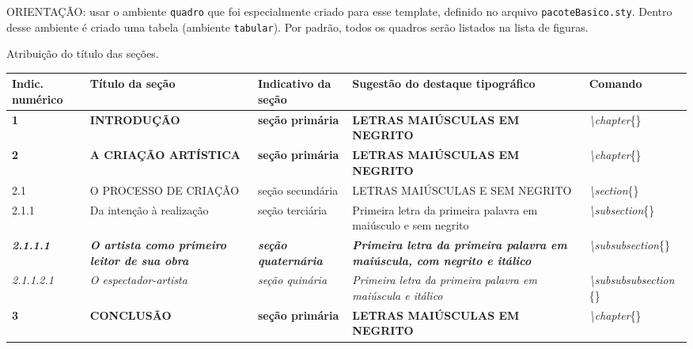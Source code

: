 

ORIENTAÇÃO: usar o  ambiente \verb|quadro| que foi especialmente criado para esse template, definido no arquivo \verb|pacoteBasico.sty|. Dentro desse ambiente é criado uma tabela (ambiente \verb|tabular|). Por padrão, todos os quadros serão listados na lista de figuras.
\begin{quadro}[H]
	\centering
	\caption{Atribuição do título das seções.}
	\begin{tabularx}{\columnwidth}{|X|X|X|X|X|}
		\hline
		Indic. numérico & Título da seção & Indicativo da seção & Sugestão do destaque tipográfico & Comando \\ \hline
		
		\textbf{1} & \textbf{INTRODUÇÃO} & \textbf{seção primária} & \textbf{LETRAS MAIÚSCULAS EM NEGRITO} & \textit{\textbackslash chapter}\{\} \\ \hline
		
		\textbf{2} & \textbf{A CRIAÇÃO ARTÍSTICA} & \textbf{seção primária} & \textbf{LETRAS MAIÚSCULAS EM NEGRITO} & \textit{\textbackslash chapter}\{\} \\ \hline
		
		2.1 & O PROCESSO DE CRIAÇÃO & seção secundária & LETRAS MAIÚSCULAS E SEM NEGRITO  & \textit{\textbackslash section}\{\} \\ \hline %
		
		2.1.1 & Da intenção à realização & seção terciária & Primeira letra da   primeira palavra em maiúsculo e sem negrito & \textit{\textbackslash subsection}\{\} \\ \hline
		
		\textit{\textbf{2.1.1.1}} & \textit{\textbf{O artista como primeiro leitor de sua obra}} & \textit{\textbf{seção quaternária}} & \textit{\textbf{Primeira letra da primeira palavra em maiúscula, com negrito e itálico}} & \textit{\textbackslash subsubsection}\{\} \\ \hline
		
		\textit{2.1.1.2.1} & \textit{O espectador-artista} & \textit{seção quinária} & \textit{Primeira letra da primeira palavra em maiúscula e itálico} & \textit{\textbackslash subsubsubsection} \{\} \\ \hline
		
		\textbf{3} & \textbf{CONCLUSÃO} & \textbf{seção primária} & \textbf{LETRAS MAIÚSCULAS EM NEGRITO} & \textit{\textbackslash chapter}\{\} \\ \hline
		

\end{tabularx}
\end{quadro}

